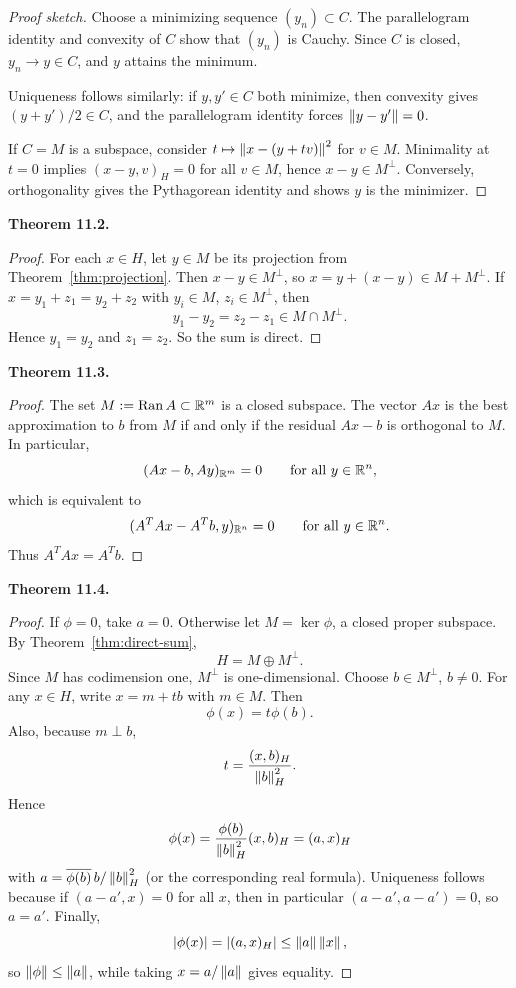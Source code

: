 \documentclass[11pt]{article}
\newenvironment{theoremstmt}[1]{%
  \par\medskip\noindent\textbf{Theorem #1. }\itshape
}{\par\medskip}
\begin{document}
\begin{proof}[Proof sketch]
Choose a minimizing sequence $(y_n)\subset C$. The parallelogram identity and convexity of $C$ show that $(y_n)$ is Cauchy. Since $C$ is closed, $y_n\to y\in C$, and $y$ attains the minimum.

Uniqueness follows similarly: if $y,y'\in C$ both minimize, then convexity gives $(y+y')/2\in C$, and the parallelogram identity forces $\left\lVert y-y'\right\rVert=0$.

If $C=M$ is a subspace, consider $t\mapsto \left\lVert x-(y+tv)\right\rVert^2$ for $v\in M$. Minimality at $t=0$ implies $(x-y,v)_H=0$ for all $v\in M$, hence $x-y\in M^{\perp}$. Conversely, orthogonality gives the Pythagorean identity and shows $y$ is the minimizer.
\end{proof}

\begin{theoremstmt}{11.2}
\thmDirectSum
\end{theoremstmt}

\begin{proof}
For each $x\in H$, let $y\in M$ be its projection from Theorem~\ref{thm:projection}. Then $x-y\in M^{\perp}$, so $x=y+(x-y)\in M+M^{\perp}$. If $x=y_1+z_1=y_2+z_2$ with $y_i\in M$, $z_i\in M^{\perp}$, then
\[
y_1-y_2=z_2-z_1\in M\cap M^{\perp}.
\]
Hence $y_1=y_2$ and $z_1=z_2$. So the sum is direct.
\end{proof}

\begin{theoremstmt}{11.3}
\thmLeastSquares
\end{theoremstmt}

\begin{proof}
The set $M:=\operatorname{Ran}A\subset\mathbb{R}^m$ is a closed subspace. The vector $Ax$ is the best approximation to $b$ from $M$ if and only if the residual $Ax-b$ is orthogonal to $M$. In particular,
\[
(Ax-b,Ay)_{\mathbb{R}^m}=0\qquad\text{for all }y\in\mathbb{R}^n,
\]
which is equivalent to
\[
(A^TAx-A^Tb,y)_{\mathbb{R}^n}=0\qquad\text{for all }y\in\mathbb{R}^n.
\]
Thus $A^TAx=A^Tb$.
\end{proof}

\begin{theoremstmt}{11.4}
\thmRieszRepresentation
\end{theoremstmt}

\begin{proof}
If $\phi=0$, take $a=0$. Otherwise let $M=\ker\phi$, a closed proper subspace. By Theorem~\ref{thm:direct-sum},
\[
H=M\oplus M^{\perp}.
\]
Since $M$ has codimension one, $M^{\perp}$ is one-dimensional. Choose $b\in M^{\perp}$, $b\neq 0$. For any $x\in H$, write $x=m+tb$ with $m\in M$. Then
\[
\phi(x)=t\phi(b).
\]
Also, because $m\perp b$,
\[
t=\frac{(x,b)_H}{\left\lVert b\right\rVert_H^2}.
\]
Hence
\[
\phi(x)=\frac{\phi(b)}{\left\lVert b\right\rVert_H^2}(x,b)_H=(a,x)_H
\]
with $a=\overline{\phi(b)}\,b/\left\lVert b\right\rVert_H^2$ (or the corresponding real formula). Uniqueness follows because if $(a-a',x)=0$ for all $x$, then in particular $(a-a',a-a')=0$, so $a=a'$. Finally,
\[
\left\lvert \phi(x)\right\rvert=\left\lvert (a,x)_H\right\rvert\le \left\lVert a\right\rVert\left\lVert x\right\rVert,
\]
so $\left\lVert \phi\right\rVert\le \left\lVert a\right\rVert$, while taking $x=a/\left\lVert a\right\rVert$ gives equality.
\end{proof}
\end{document}
